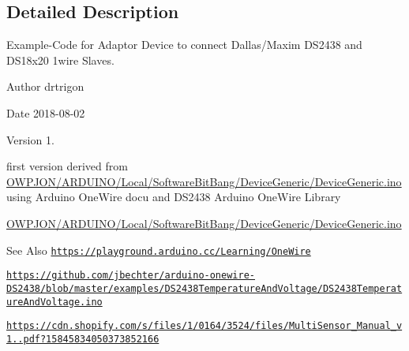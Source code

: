 \subsection{Detailed Description}
Example-\/\-Code for Adaptor Device to connect Dallas/\-Maxim D\-S2438 and D\-S18x20 1wire Slaves. \begin{DoxyAuthor}{Author}
drtrigon 
\end{DoxyAuthor}
\begin{DoxyDate}{Date}
2018-\/08-\/02 
\end{DoxyDate}
\begin{DoxyVersion}{Version}
1. \begin{DoxyItemize}
\item first version derived from \hyperlink{ARDUINO_2Local_2SoftwareBitBang_2DeviceGeneric_2DeviceGeneric_8ino}{O\-W\-P\-J\-O\-N/\-A\-R\-D\-U\-I\-N\-O/\-Local/\-Software\-Bit\-Bang/\-Device\-Generic/\-Device\-Generic.\-ino} using Arduino One\-Wire docu and D\-S2438 Arduino One\-Wire Library\end{DoxyItemize}
\hyperlink{ARDUINO_2Local_2SoftwareBitBang_2DeviceGeneric_2DeviceGeneric_8ino}{O\-W\-P\-J\-O\-N/\-A\-R\-D\-U\-I\-N\-O/\-Local/\-Software\-Bit\-Bang/\-Device\-Generic/\-Device\-Generic.\-ino} 
\end{DoxyVersion}
\begin{DoxySeeAlso}{See Also}
\href{https://playground.arduino.cc/Learning/OneWire}{\tt https\-://playground.\-arduino.\-cc/\-Learning/\-One\-Wire} 

\href{https://github.com/jbechter/arduino-onewire-DS2438/blob/master/examples/DS2438TemperatureAndVoltage/DS2438TemperatureAndVoltage.ino}{\tt https\-://github.\-com/jbechter/arduino-\/onewire-\/\-D\-S2438/blob/master/examples/\-D\-S2438\-Temperature\-And\-Voltage/\-D\-S2438\-Temperature\-And\-Voltage.\-ino} 

\href{https://cdn.shopify.com/s/files/1/0164/3524/files/MultiSensor_Manual_v1.5.pdf?15845834050373852166}{\tt https\-://cdn.\-shopify.\-com/s/files/1/0164/3524/files/\-Multi\-Sensor\-\_\-\-Manual\-\_\-v1..\-pdf?15845834050373852166}
\end{DoxySeeAlso}
